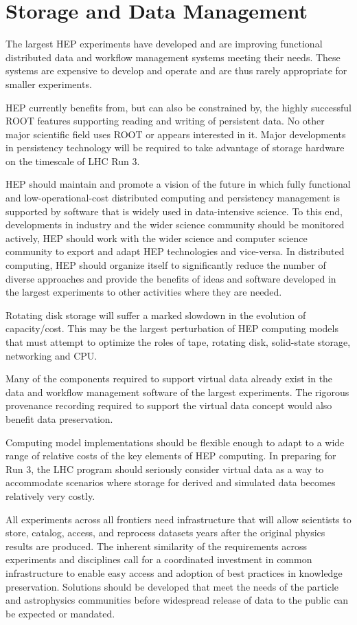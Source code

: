 \section{Storage and Data Management}


The largest HEP experiments have developed and are improving
functional distributed data and workflow management systems meeting
their needs. These systems are expensive to develop and operate and
are thus  rarely appropriate for smaller experiments.

HEP currently benefits from, but can also be  constrained by, the
highly successful ROOT features supporting reading  and writing of
persistent data. No other major scientific field uses  ROOT or appears
interested in it. Major developments in persistency  technology will
be required to take advantage of storage hardware on the  timescale of
LHC Run 3.

HEP should maintain and promote a vision of the future  in which fully
functional and low-operational-cost distributed computing and
persistency management is supported by software that is widely used in
data-intensive science.  To this end, developments in industry and the
wider  science community should be monitored actively, HEP should work
with the wider  science and computer science community to export and
adapt HEP technologies and  vice-versa. In distributed computing, HEP
should organize itself to significantly  reduce the number of diverse
approaches and provide the benefits of ideas and  software developed
in the largest experiments to other activities where they are needed.

Rotating disk storage will suffer a marked slowdown in the  evolution
of capacity/cost.  This may be the largest perturbation of HEP
computing  models that must attempt to optimize the roles of tape,
rotating disk, solid-state  storage, networking and CPU.

Many of the components required to support virtual data  already exist
in the data and workflow management software of the largest
experiments.   The rigorous provenance recording required to support
the virtual data concept would  also benefit data preservation.

Computing model implementations should be flexible  enough to adapt to
a wide range of relative costs of the key elements of HEP  computing.
In preparing for Run 3, the LHC program should seriously consider
virtual data as a way to accommodate scenarios where storage for
derived and  simulated data becomes relatively very costly.

All experiments across all frontiers
need  infrastructure that will allow scientists to store, catalog,
access, and  reprocess datasets years after the original physics
results are produced.  The inherent similarity of the requirements
across experiments and disciplines  call for a coordinated investment
in common infrastructure to enable easy  access and adoption of best
practices in knowledge preservation.  Solutions  should be developed
that meet the needs of the particle and astrophysics  communities
before widespread release of data to the public can be expected  or
mandated.

